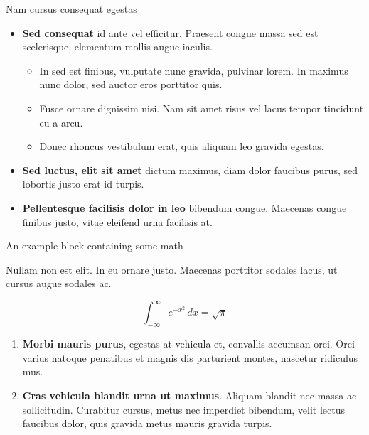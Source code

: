 \documentclass[final]{beamer}
\newlength{\colwidth}
\begin{document}
\begin{frame}[t]
\begin{columns}[t]
\begin{column}{\colwidth}
\begin{block}{Nam cursus consequat egestas}
        \begin{itemize}
          \item \textbf{Sed consequat} id ante vel efficitur. Praesent congue massa
          sed est scelerisque, elementum mollis augue iaculis.
          \begin{itemize}
            \item In sed est finibus, vulputate
            nunc gravida, pulvinar lorem. In maximus nunc dolor, sed auctor eros
            porttitor quis.
            \item Fusce ornare dignissim nisi. Nam sit amet risus vel lacus
            tempor tincidunt eu a arcu.
            \item Donec rhoncus vestibulum erat, quis aliquam leo
            gravida egestas.
          \end{itemize}
          \item \textbf{Sed luctus, elit sit amet} dictum maximus, diam dolor
          faucibus purus, sed lobortis justo erat id turpis.
          \item \textbf{Pellentesque facilisis dolor in leo} bibendum congue.
          Maecenas congue finibus justo, vitae eleifend urna facilisis at.
        \end{itemize}

      \end{block}

      \begin{exampleblock}{An example block containing some math}{}

        Nullam non est elit. In eu ornare justo. Maecenas porttitor sodales lacus,
        ut cursus augue sodales ac.

        $$
        \int_{-\infty}^{\infty} e^{-x^2}\,dx = \sqrt{\pi}
        $$

        \begin{enumerate}
          \item \textbf{Morbi mauris purus}, egestas at vehicula et, convallis
          accumsan orci. Orci varius natoque penatibus et magnis dis parturient
          montes, nascetur ridiculus mus.
          \item \textbf{Cras vehicula blandit urna ut maximus}. Aliquam blandit nec
          massa ac sollicitudin. Curabitur cursus, metus nec imperdiet bibendum,
          velit lectus faucibus dolor, quis gravida metus mauris gravida turpis.
        \end{enumerate}



\end{exampleblock}
\end{column}
\end{columns}
\end{frame}
\end{document}
